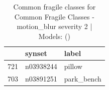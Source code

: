 \begin{table}
\caption{Common fragile classes for Common Fragile Classes - motion_blur severity 2 | Models: ()}
\label{tab:Common Fragile Classes - motion_blur severity 2_d41d8cd9}
\begin{tabular}{cll}
\toprule
 & synset & label \\
\midrule
721 & n03938244 & pillow \\
703 & n03891251 & park_bench \\
\bottomrule
\end{tabular}
\end{table}
